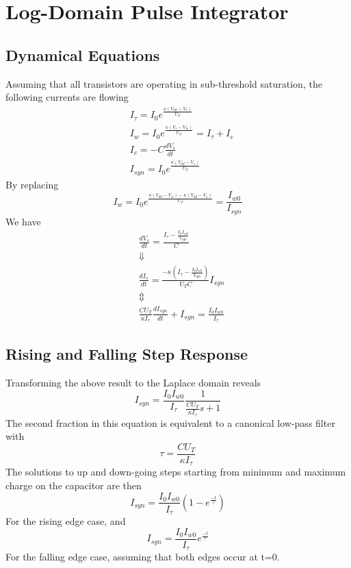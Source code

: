 


\newpage
\section{Log-Domain Pulse Integrator}
\subsection{Dynamical Equations}
Assuming that all transistors are operating in sub-threshold saturation, the following currents are flowing
\begin{align*}
    &I_\tau = I_0e^{\frac{\kappa(V_{dd}-V_\tau)}{U_T}} \\
    &I_w = I_0e^{\frac{\kappa(V_s-V_w)}{U_T}} = I_\tau + I_c \\
    &I_c = -C\frac{dV_s}{dt} \\
    &I_{syn} = I_0e^{\frac{\kappa(V_{dd}-V_s)}{U_T}}
\end{align*}
By replacing
\begin{equation*}
    I_w = I_0e^{\frac{\kappa(V_{dd}-V_w)-\kappa(V_{dd}-V_s)}{U_T}}  = \frac{I_{w0}}{I_{syn}}
\end{equation*}
We have
\begin{align*}
    &\frac{dV_s}{dt} = \frac{I_\tau - \frac{I_0I_{w0}}{I_{syn}}}{C} \\
    &\Downarrow \\
    &\frac{dI_s}{dt} = \frac{-\kappa\left(I_\tau - \frac{I_0I_{w0}}{I_{syn}}\right)}{U_TC}I_{syn} \\
    &\Updownarrow \\
    &\frac{CU_T}{\kappa I_\tau}\frac{dI_{syn}}{dt} + I_{syn} = \frac{I_0I_{w0}}{I_\tau}
\end{align*}

\subsection{Rising and Falling Step Response}
Transforming the above result to the Laplace domain reveals
\begin{equation*}
    I_{syn} = \frac{I_0I_{w0}}{I_\tau}\frac{1}{\frac{CU_T}{\kappa I_\tau}s+1}
\end{equation*}
The second fraction in this equation is equivalent to a canonical low-pass filter with 
\begin{equation*}
    \tau = \frac{CU_T}{\kappa I_\tau}
\end{equation*}
The solutions to up and down-going steps starting from minimum and maximum charge on the capacitor are
then
\begin{equation*}
    I_{syn} = \frac{I_0I_{w0}}{I_\tau}\left(1-e^{\frac{-t}{\tau}}\right)
\end{equation*}
For the rising edge case, and
\begin{equation*}
    I_{syn} = \frac{I_0I_{w0}}{I_\tau}e^{\frac{-t}{\tau}}
\end{equation*}
For the falling edge case, assuming that both edges occur at t=0.

